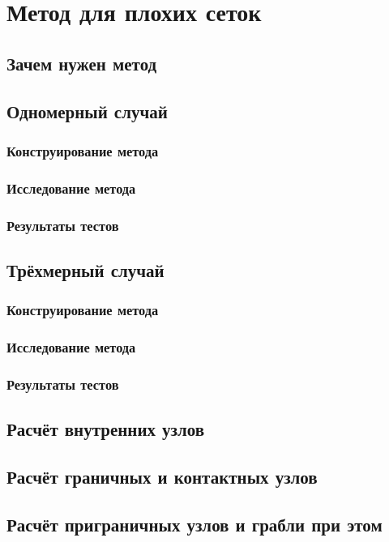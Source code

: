 \section{Метод для плохих сеток}

\subsection{Зачем нужен метод}


\subsection{Одномерный случай}

\subsubsection{Конструирование метода}

\subsubsection{Исследование метода}


\subsubsection{Результаты тестов}

\subsection{Трёхмерный случай}

\subsubsection{Конструирование метода}

\subsubsection{Исследование метода}


\subsubsection{Результаты тестов}

\subsection{Расчёт внутренних узлов}

\subsection{Расчёт граничных и контактных узлов}

\subsection{Расчёт приграничных узлов и грабли при этом}

